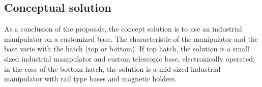 \subsection{Conceptual solution}
As a conclusion of the proposals, the concept solution is to use an
industrial manipulator on a customized base. The characteristic of the
manipulator and the base varie with the hatch (top or bottom). If top hatch, the solution is a small
sized industrial manipulator and custom telescopic base, electronically
operated; in the case of the bottom hatch, the solution is a mid-sized industrial manipulator
with rail type bases and magnetic holders.


